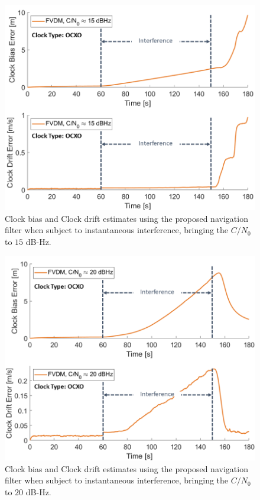 \begin{figure}[!ht]
    \centering
    \includegraphics[width=0.75\linewidth]{Figures/Results/trajectoryfigure/Slide20.PNG}
    \caption{Clock bias and Clock drift estimates using the proposed navigation filter when subject to instantaneous interference, bringing the \(C/N_0\) to \(15\) dB-Hz.}\label{fig:Clk15}
\end{figure}

\begin{figure}[!ht]
    \centering
    \includegraphics[width=0.75\linewidth]{Figures/Results/trajectoryfigure/Slide21.PNG}
    \caption{Clock bias and Clock drift estimates using the proposed navigation filter when subject to instantaneous interference, bringing the \(C/N_0\) to \(20\) dB-Hz.}\label{fig:Clk20}
\end{figure}

